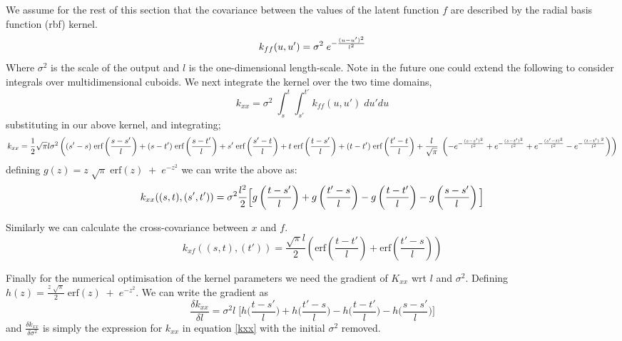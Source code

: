 \documentclass[a4paper]{article}
\begin{document}
\begin{multicols}{2}
We assume for the rest of this section that the covariance between the values of the latent function $f$ are described by the radial basis function (rbf) kernel.
\begin{equation}
k_{ff}(u,u') = \sigma^2\; e^{-{{(u-u')^2} \over {l^2}}}
\end{equation}
Where $\sigma^2$ is the scale of the output and $l$ is the one-dimensional length-scale. Note in the future one could extend the following to consider integrals over multidimensional cuboids. We next integrate the kernel over the two time domains,
\begin{equation}
k_{xx} = \sigma^2\; \int_s^t \int_{s'}^{t'} k_{ff}(u,u')\; du' du
\end{equation}
substituting in our above kernel, and integrating;
\begin{dmath}
k_{xx} = \frac{1}{2} \sqrt{\pi } l \sigma^2 \\ \left({(s'-s)}\; \textrm{erf}\left(\frac{s-s'}{l}\right)+(s-t')\;
   \textrm{erf}\left(\frac{s-t'}{l}\right)+s'\; \textrm{erf}\left(\frac{s'-t}{l}\right)+t\;
   \textrm{erf}\left(\frac{t-s'}{l}\right)+(t-t')\; \textrm{erf}\left(\frac{t'-t}{l}\right)+\frac{l}{\sqrt{\pi }}\;
   \left(-e^{-\frac{(s-s')^2}{l^2}}+e^{-\frac{(s-t')^2}{l^2}}+e^{-\frac{(s'-t)^2}{l^2}}-e^{-\frac{(t-t')\;
   ^2}{l^2}}\right)\right)
\end{dmath}
defining $g(z) = z\;\sqrt{\pi}\;\textrm{erf}(z)\;+\;e^{-z^2}$ we can write the above as:
\begin{dmath}
k_{xx}((s,t),(s',t')) = \\ \sigma^2 \frac{l^2}{2} \Big[ g \left(\frac{t-s'}{l} \right) + g \left(\frac{t'-s}{l} \right) - g \left(\frac{t-t'}{l} \right) - g \left(\frac{s-s'}{l} \right) \Big]
\label{kxx}
\end{dmath}

Similarly we can calculate the cross-covariance between $x$ and $f$.
\begin{dmath}
k_{xf}((s,t),(t')) = \frac{\sqrt{\pi } l}{2} \left(\textrm{erf}\left(\frac{t-t'}{l}\right)+\textrm{erf}\left(\frac{t'-s}{l}\right)\right)
\end{dmath}

Finally for the numerical optimisation of the kernel parameters we need the gradient of $K_{xx}$ wrt $l$ and $\sigma^2$. Defining $h(z) = \frac{z\;\sqrt{\pi}}{2}\;\textrm{erf}(z)\;+\;e^{-z^2}$. We can write the gradient as
\begin{dmath}
\frac{\delta k_{xx}}{\delta l} = \sigma^2 l\;\Big[h \Big(\frac{t-s'}{l}\Big) + h \Big(\frac{t'-s}{l}\Big) - h \Big(\frac{t-t'}{l}\Big) - h \Big(\frac{s-s'}{l}\Big) \Big]
\end{dmath}
and $\frac{\delta k_{xx}}{\delta \sigma^2}$ is simply the expression for $k_{xx}$ in equation \ref{kxx} with the initial $\sigma^2$ removed.


\end{multicols}
\end{document}
